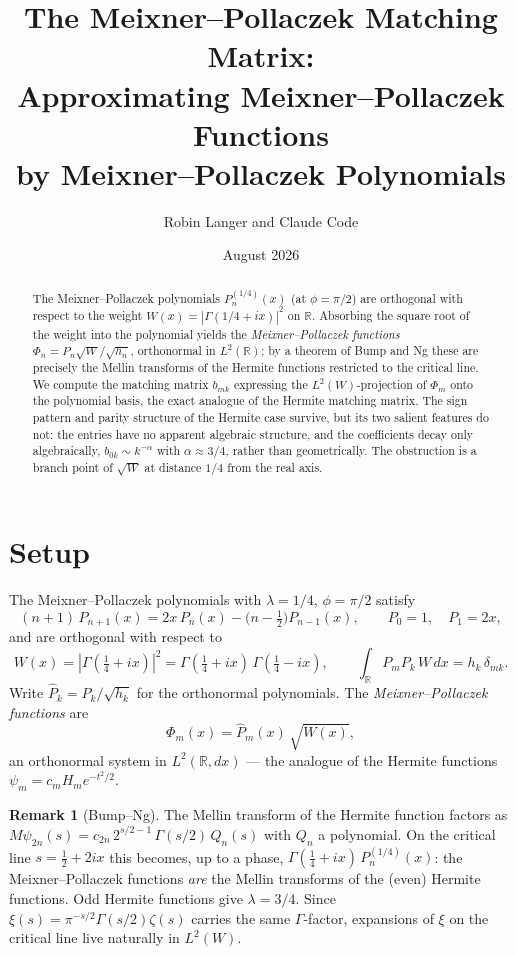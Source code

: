 \documentclass[11pt,a4paper]{article}
\title{\textbf{The Meixner--Pollaczek Matching Matrix:\\
Approximating Meixner--Pollaczek Functions\\
by Meixner--Pollaczek Polynomials}}
\author{Robin Langer and Claude Code}
\date{August 2026}
\theoremstyle{definition}
\newtheorem{remark}[definition]{Remark}
\theoremstyle{plain}
\newcommand{\R}{\mathbb{R}}
\begin{document}
\maketitle

\begin{abstract}
The Meixner--Pollaczek polynomials $P_n^{(1/4)}(x)$ (at $\phi = \pi/2$)
are orthogonal with respect to the weight $W(x) = |\Gamma(1/4 + ix)|^2$
on $\R$. Absorbing the square root of the weight into the polynomial
yields the \emph{Meixner--Pollaczek functions}
$\Phi_n = P_n \sqrt{W} / \sqrt{h_n}$, orthonormal in $L^2(\R)$; by a
theorem of Bump and Ng these are precisely the Mellin transforms of the
Hermite functions restricted to the critical line. We compute the
matching matrix $b_{mk}$ expressing the $L^2(W)$-projection of $\Phi_m$
onto the polynomial basis, the exact analogue of the Hermite matching
matrix. The sign pattern and parity structure of the Hermite case
survive, but its two salient features do not: the entries have no
apparent algebraic structure, and the coefficients decay only
algebraically, $b_{0k} \sim k^{-\alpha}$ with $\alpha \approx 3/4$,
rather than geometrically. The obstruction is a branch point of
$\sqrt{W}$ at distance $1/4$ from the real axis.
\end{abstract}

\section{Setup}

The Meixner--Pollaczek polynomials with $\lambda = 1/4$, $\phi = \pi/2$
satisfy
\[
  (n+1)\, P_{n+1}(x) = 2x\, P_n(x) - \bigl(n - \tfrac12\bigr) P_{n-1}(x),
  \qquad P_0 = 1, \quad P_1 = 2x,
\]
and are orthogonal with respect to
\[
  W(x) = |\Gamma(\tfrac14 + ix)|^2
       = \Gamma(\tfrac14 + ix)\,\Gamma(\tfrac14 - ix),
  \qquad
  \int_\R P_m P_k\, W\, dx = h_k\, \delta_{mk}.
\]
Write $\widehat{P}_k = P_k / \sqrt{h_k}$ for the orthonormal
polynomials. The \emph{Meixner--Pollaczek functions} are
\[
  \Phi_m(x) = \widehat{P}_m(x)\, \sqrt{W(x)},
\]
an orthonormal system in $L^2(\R, dx)$ --- the analogue of the Hermite
functions $\psi_m = c_m H_m e^{-t^2/2}$.

\begin{remark}[Bump--Ng]
The Mellin transform of the Hermite function factors as
$M\psi_{2n}(s) = c_{2n}\, 2^{s/2-1}\, \Gamma(s/2)\, Q_n(s)$ with $Q_n$ a
polynomial. On the critical line $s = \tfrac12 + 2ix$ this becomes, up
to a phase, $\Gamma(\tfrac14 + ix)\, P_n^{(1/4)}(x)$: the
Meixner--Pollaczek functions \emph{are} the Mellin transforms of the
(even) Hermite functions. Odd Hermite functions give $\lambda = 3/4$.
Since $\xi(s) = \pi^{-s/2}\Gamma(s/2)\zeta(s)$ carries the same
$\Gamma$-factor, expansions of $\xi$ on the critical line live naturally
in $L^2(W)$.
\end{remark}
\end{document}
